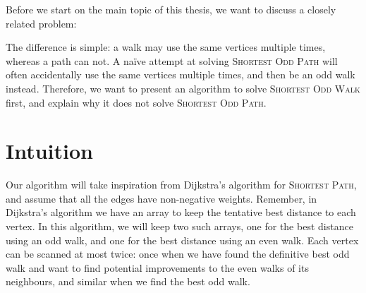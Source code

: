Before we start on the main topic of this thesis, we want to discuss a closely related problem:


The difference is simple: a walk may use the same vertices multiple times, whereas a path can not. A naïve attempt at solving \textsc{Shortest Odd Path} will often accidentally use the same vertices multiple times, and then be an odd walk instead. Therefore, we want to present an algorithm to solve \textsc{Shortest Odd Walk} first, and explain why it does not solve \textsc{Shortest Odd Path}.

\section{Intuition}
Our algorithm will take inspiration from Dijkstra's algorithm for \textsc{Shortest Path}, and assume that all the edges have non-negative weights. Remember, in Dijkstra's algorithm we have an array to keep the tentative best distance to each vertex. In this algorithm, we will keep two such arrays, one for the best distance using an odd walk, and one for the best distance using an even walk. Each vertex can be scanned at most twice: once when we have found the definitive best odd walk and want to find potential improvements to the even walks of its neighbours, and similar when we find the best odd walk.

